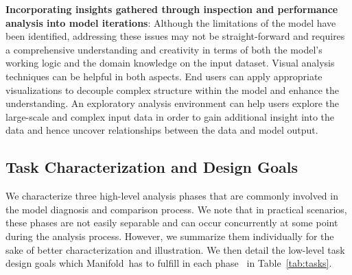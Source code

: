 \documentclass[preprint,journal]{vgtc}       %
\newcommand{\techname}{Manifold}
\begin{document}
\textbf{Incorporating insights gathered through inspection and performance analysis into model iterations}: Although the limitations of the model have been identified, addressing these issues may not be straight-forward and requires a comprehensive understanding and creativity in terms of both the model's working logic and the domain knowledge on the input dataset. Visual analysis techniques can be helpful in both aspects. End users can apply appropriate visualizations to decouple complex structure within the model and enhance the understanding. An exploratory analysis environment can help users explore the large-scale and complex input data in order to gain additional insight into the data and hence uncover relationships between the data and model output.



\subsection{Task Characterization and Design Goals}
We characterize three high-level analysis phases that are commonly involved in the model diagnosis and comparison process. We note that in practical scenarios, these phases are not easily separable and can occur concurrently at some point during the analysis process. However, we summarize them individually for the sake of better characterization and illustration.
We then detail the low-level task design goals which \techname\ has to fulfill in each phase~\cite{munzner2009nested} in Table~\ref{tab:tasks}.
\end{document}

